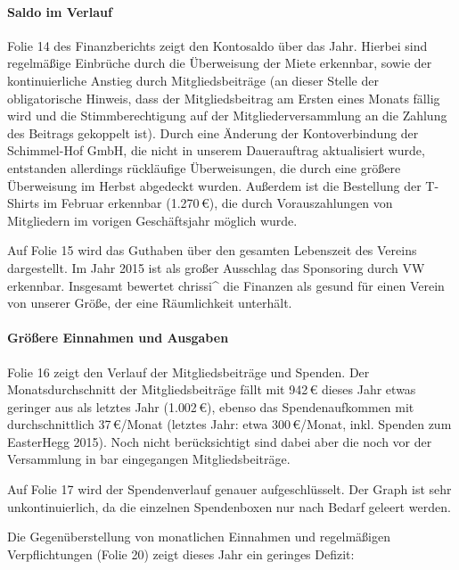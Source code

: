 \documentclass[parskip=half-]{s0minutes}
\begin{document}
\paragraph{Saldo im Verlauf}
Folie 14 des Finanzberichts zeigt den Kontosaldo über das Jahr. Hierbei sind
regelmäßige Einbrüche durch die Überweisung der Miete erkennbar, sowie der
kontinuierliche Anstieg durch Mitgliedsbeiträge (an dieser Stelle der
obligatorische Hinweis, dass der Mitgliedsbeitrag am Ersten eines Monats fällig
wird und die Stimmberechtigung auf der Mitgliederversammlung an die Zahlung des
Beitrags gekoppelt ist). Durch eine Änderung der Kontoverbindung der
Schimmel-Hof GmbH, die nicht in unserem Dauerauftrag aktualisiert wurde,
entstanden allerdings rückläufige Überweisungen, die durch eine größere
Überweisung im Herbst abgedeckt wurden. Außerdem ist die Bestellung der T-Shirts
im Februar erkennbar (1{.}270\,€), die durch Vorauszahlungen von Mitgliedern im
vorigen Geschäftsjahr möglich wurde.

Auf Folie 15 wird das Guthaben über den gesamten Lebenszeit des Vereins
dargestellt. Im Jahr 2015 ist als großer Ausschlag das Sponsoring durch VW
erkennbar. Insgesamt bewertet chrissi\^{} die Finanzen als gesund für einen
Verein von unserer Größe, der eine Räumlichkeit unterhält.

\paragraph{Größere Einnahmen und Ausgaben}
Folie 16 zeigt den Verlauf der Mitgliedsbeiträge und Spenden. Der
Monatsdurchschnitt der Mitgliedsbeiträge fällt mit 942\,€ dieses Jahr etwas
geringer aus als letztes Jahr (1{.}002\,€), ebenso das Spendenaufkommen mit
durchschnittlich 37\,€/Monat (letztes Jahr: etwa 300\,€/Monat, inkl. Spenden zum
EasterHegg 2015). Noch nicht berücksichtigt sind dabei aber die noch vor der
Versammlung in bar eingegangen Mitgliedsbeiträge.

Auf Folie 17 wird der Spendenverlauf genauer aufgeschlüsselt. Der Graph ist sehr
unkontinuierlich, da die einzelnen Spendenboxen nur nach Bedarf geleert werden.

Die Gegenüberstellung von monatlichen Einnahmen und regelmäßigen Verpflichtungen
(Folie 20) zeigt dieses Jahr ein geringes Defizit:
\end{document}
